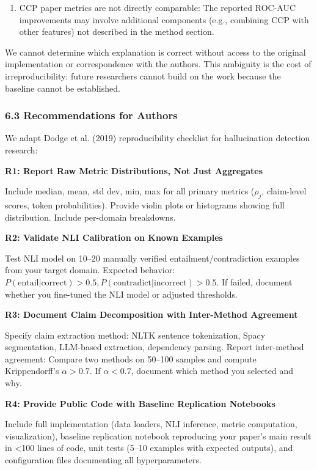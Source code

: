\begin{enumerate}
\item CCP paper metrics are not directly comparable: The reported ROC-AUC improvements may involve additional components (e.g., combining CCP with other features) not described in the method section.
\end{enumerate}

We cannot determine which explanation is correct without access to the original implementation or correspondence with the authors. This ambiguity is the cost of irreproducibility: future researchers cannot build on the work because the baseline cannot be established.

\subsubsection{6.3 Recommendations for Authors}

We adapt Dodge et al. (2019) reproducibility checklist for hallucination detection research:

\textbf{R1: Report Raw Metric Distributions, Not Just Aggregates}

Include median, mean, std dev, min, max for all primary metrics ($\rho_j$, claim-level scores, token probabilities). Provide violin plots or histograms showing full distribution. Include per-domain breakdowns.

\textbf{R2: Validate NLI Calibration on Known Examples}

Test NLI model on 10--20 manually verified entailment/contradiction examples from your target domain. Expected behavior: $P(\text{entail}|\text{correct}) > 0.5, P(\text{contradict}|\text{incorrect}) > 0.5$. If failed, document whether you fine-tuned the NLI model or adjusted thresholds.

\textbf{R3: Document Claim Decomposition with Inter-Method Agreement}

Specify claim extraction method: NLTK sentence tokenization, Spacy segmentation, LLM-based extraction, dependency parsing. Report inter-method agreement: Compare two methods on 50--100 samples and compute Krippendorff's $\alpha > 0.7$. If $\alpha < 0.7$, document which method you selected and why.

\textbf{R4: Provide Public Code with Baseline Replication Notebooks}

Include full implementation (data loaders, NLI inference, metric computation, visualization), baseline replication notebook reproducing your paper's main result in <100 lines of code, unit tests (5--10 examples with expected outputs), and configuration files documenting all hyperparameters.

